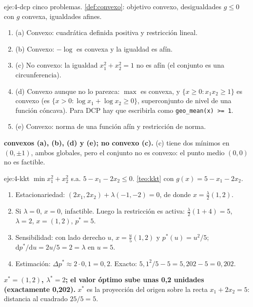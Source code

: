 \begin{solucion}{eje:4-dcp}
\datos cinco problemas.
\planteamiento \cref{def:convexo}: objetivo convexo, desigualdades $g\le 0$ con $g$ convexa, igualdades afines.
\pasos
\begin{enumerate}[label=\arabic*.]
  \item (a) Convexo: cuadrática definida positiva y restricción lineal.
  \item (b) Convexo: $-\log$ es convexa y la igualdad es afín.
  \item (c) No convexo: la igualdad $x_1^{2}+x_2^{2}=1$ no es afín (el conjunto es una circunferencia).
  \item (d) Convexo aunque no lo parezca: $\max$ es convexa, y $\{x\ge 0: x_1x_2\ge 1\}$ es convexo (es $\{x>0: \log x_1+\log x_2\ge 0\}$, superconjunto de nivel de una función cóncava). Para DCP hay que escribirla como \texttt{geo\_mean(x) >= 1}.
  \item (e) Convexo: norma de una función afín y restricción de norma.
\end{enumerate}
\resultado \textbf{convexos (a), (b), (d) y (e); no convexo (c).}
\comprobacion (c) tiene dos mínimos en $(0,\pm 1)$, ambos globales, pero el conjunto no es convexo: el punto medio $(0,0)$ no es factible.
\end{solucion}

\begin{solucion}{eje:4-kkt}
\datos $\min x_1^{2}+x_2^{2}$ s.a. $5-x_1-2x_2\le 0$.
\planteamiento \cref{teo:kkt} con $g(x)=5-x_1-2x_2$.
\pasos
\begin{enumerate}[label=\arabic*.]
  \item Estacionariedad: $(2x_1,2x_2)+\lambda(-1,-2)=0$, de donde $x=\tfrac{\lambda}{2}(1,2)$.
  \item Si $\lambda=0$, $x=0$, infactible. Luego la restricción es activa: $\tfrac{\lambda}{2}(1+4)=5$, $\lambda=2$, $x=(1,2)$, $p^{*}=5$.
  \item Sensibilidad: con lado derecho $u$, $x=\tfrac{u}{5}(1,2)$ y $p^{*}(u)=u^{2}/5$; $\mathrm{d}p^{*}/\mathrm{d}u=2u/5=2=\lambda$ en $u=5$.
  \item Estimación: $\Delta p^{*}\approx 2\cdot 0{,}1=0{,}2$. Exacto: $5{,}1^{2}/5-5=5{,}202-5=0{,}202$.
\end{enumerate}
\resultado \textbf{$x^{*}=(1,2)$, $\lambda^{*}=2$; el valor óptimo sube unas 0,2 unidades (exactamente 0,202).}
\comprobacion $x^{*}$ es la proyección del origen sobre la recta $x_1+2x_2=5$: distancia al cuadrado $25/5=5$.
\end{solucion}

